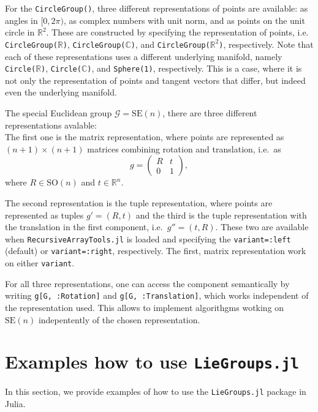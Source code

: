 \documentclass{juliacon}
\begin{document}
For the \verb|CircleGroup()|, three different representations of points are available: as angles in \([0, 2\pi)\), as complex numbers with unit norm, and as points on the unit circle in \(\mathbb{R}^2\).
These are constructed by specifying the representation of points, i.e. \verb|CircleGroup(|$\mathbb R$\verb|)|, \verb|CircleGroup(|$\mathbb C$\verb|)|, and \verb|CircleGroup(|$\mathbb R^2$\verb|)|, respectively. Note that each of these representations uses a different underlying manifold, namely \verb|Circle(|$\mathbb R$\verb|)|, \verb|Circle(|$\mathbb C$\verb|)|, and \verb|Sphere(1)|, respectively.
This is a case, where it is not only the representation of points and tangent vectors that differ, but indeed even the underlying manifold.

The special Euclidean group \(\mathcal G = \mathrm{SE}(n)\), there are three different representations avalable:
\\
The first one is the matrix representation, where points are represented as \((n+1) \times (n+1)\) matrices combining rotation and translation, i.e.\ as
\begin{equation*}
    g = \begin{pmatrix} R & t \\
    0 & 1 \end{pmatrix},
\end{equation*}
where \(R \in \mathrm{SO}(n)\) and \(t \in \mathbb{R}^n\).

The second representation is the tuple representation, where points are represented as tuples \(g' = (R, t)\) and the third is the tuple representation with the translation in the first component, i.e.\ \(g'' = (t, R)\). These two are available when \verb|RecursiveArrayTools.jl| is loaded and specifying the \verb|variant=:left| (default) or \verb|variant=:right|, respectively.
The first, matrix representation work on either \verb|variant|.

For all three representations, one can access the component semantically by writing \verb|g[G, :Rotation]| and \verb|g[G, :Translation]|, which works independent of the representation used. This allows to implement algorithgms wotking on \(\mathrm{SE}(n)\) indepentently of the chosen representation.

\section{Examples how to use {\texttt{LieGroups.jl}}}%
\label{sec:Example}

In this section, we provide examples of how to use the {\texttt{LieGroups.jl}} package in Julia.
\end{document}
